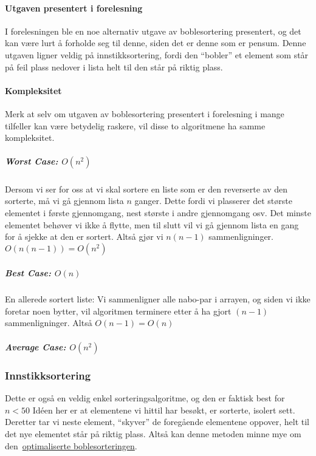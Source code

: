 
\paragraph*{Utgaven presentert i forelesning}\label{sec:bubbleoptimal}
I forelesningen ble en noe alternativ utgave av boblesortering presentert, og det kan være lurt å forholde seg til denne, siden det er denne som er pensum.
Denne utgaven ligner veldig på innstikksortering, fordi den ``bobler'' et element som står på feil plass nedover i lista helt til den står på riktig plass.


\paragraph{Kompleksitet}
Merk at selv om utgaven av boblesortering presentert i forelesning i mange tilfeller kan være
betydelig raskere, vil disse to algoritmene ha samme kompleksitet.

\subparagraph{Worst Case: $O(n^2)$} Dersom vi ser for oss at vi skal sortere en
liste som er den reverserte av den sorterte, må vi gå gjennom lista $n$ ganger.
Dette fordi vi plasserer det største elementet i første gjennomgang, nest
største i andre gjennomgang osv. Det minste elementet behøver vi ikke å flytte,
men til slutt vil vi gå gjennom lista en gang for å sjekke at den er sortert.
Altså gjør vi $n(n-1)$ sammenligninger. $O(n(n-1)) = O(n^2 )$

\subparagraph{Best Case: $O(n)$} En allerede sortert liste: Vi sammenligner alle nabo-par i arrayen, og
siden vi ikke foretar noen bytter, vil algoritmen terminere etter å ha gjort
$(n-1)$ sammenligninger. Altså $O(n-1) = O(n)$

\subparagraph{Average Case: $O(n^2)$} 


\subsubsection{\color{red}Innstikksortering}\label{insertsort}
Dette er også en veldig enkel sorteringsalgoritme, og den er faktisk best for $n<50$
Idéen her er at elementene vi hittil har besøkt, er sorterte, isolert sett.
Deretter tar vi neste element, ``skyver'' de foregående elementene oppover,
helt til det nye elementet står på riktig plass.
Altså kan denne metoden minne mye om den~\hyperref[sec:bubbleoptimal]{optimaliserte boblesorteringen}. 


